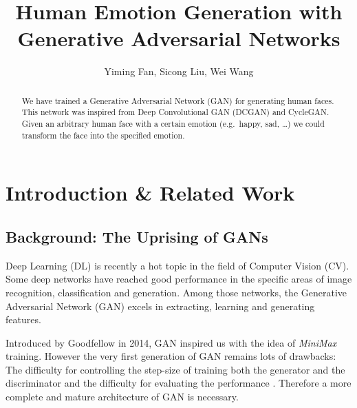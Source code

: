 \documentclass[runningheads]{llncs}
\begin{document}
\pagestyle{headings}
\mainmatter
\def\ECCV16SubNumber{***}  %

\title{Human Emotion Generation with Generative Adversarial Networks} %

\titlerunning{}


\author{Yiming Fan, Sicong Liu, Wei Wang}


\maketitle

\begin{abstract}
We have trained a Generative Adversarial Network (GAN) for generating human faces. This network was inspired from Deep Convolutional GAN (DCGAN) and CycleGAN. Given an arbitrary human face with a certain emotion (e.g.~happy, sad, \dots) we could transform the face into the specified emotion.
\end{abstract}

\section{Introduction \& Related Work}

\subsection{Background: The Uprising of GANs}
Deep Learning (DL) is recently a hot topic in the field of Computer Vision (CV). Some deep networks have reached good performance in the specific areas of image recognition, classification and generation. Among those networks, the Generative Adversarial Network (GAN) excels in extracting, learning and generating features.

Introduced by Goodfellow \cite{goodfellow-2014} in 2014, GAN inspired us with the idea of \textit{MiniMax} training. However the very first generation of GAN remains lots of drawbacks: The difficulty for controlling the step-size of training both the generator and the discriminator and the difficulty for evaluating the performance \cite{arjovsky_bottou_2017}. Therefore a more complete and mature architecture of GAN is necessary.
\end{document}
